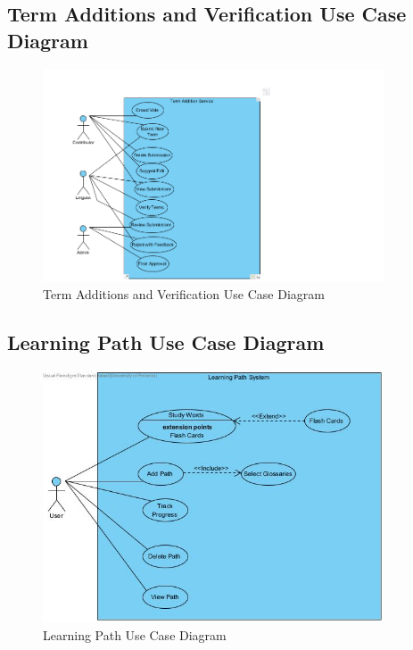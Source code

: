 \documentclass[12pt]{article}
\begin{document}
\subsection{Term Additions and Verification Use Case Diagram}
\begin{figure}[H]
  \centering
  \includegraphics[width=0.9\textwidth]{TermAdditions.png}
  \caption{Term Additions and Verification Use Case Diagram}
  \label{fig:Term Additions and Verification}
\end{figure}

\subsection{Learning Path Use Case Diagram}
\begin{figure}[H]
  \centering
  \includegraphics[width=0.9\textwidth]{learning_path.jpg}
  \caption{Learning Path Use Case Diagram}
  \label{fig:Learning Path Use Case Diagram}
\end{figure}
\end{document}
